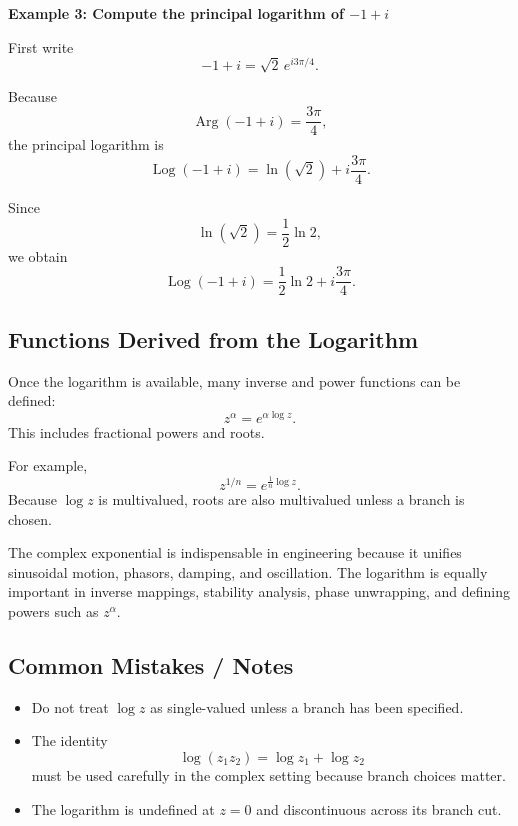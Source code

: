 \begin{examplebox}
    \textbf{Example 3: Compute the principal logarithm of $-1+i$}

    First write
    \[
        -1+i=\sqrt{2}\,e^{i3\pi/4}.
    \]

    Because
    \[
        \operatorname{Arg}(-1+i)=\frac{3\pi}{4},
    \]
    the principal logarithm is
    \[
        \operatorname{Log}(-1+i)=\ln(\sqrt{2})+i\frac{3\pi}{4}.
    \]

    Since
    \[
        \ln(\sqrt{2})=\frac12\ln 2,
    \]
    we obtain
    \[
        \operatorname{Log}(-1+i)=\frac12\ln 2+i\frac{3\pi}{4}.
    \]
\end{examplebox}

\subsection*{Functions Derived from the Logarithm}

Once the logarithm is available, many inverse and power functions can be defined:
\[
    z^\alpha = e^{\alpha \log z}.
\]
This includes fractional powers and roots.

For example,
\[
    z^{1/n}=e^{\frac1n\log z}.
\]
Because $\log z$ is multivalued, roots are also multivalued unless a branch is chosen.

\begin{noteBox}
    The complex exponential is indispensable in engineering because it unifies sinusoidal motion, phasors, damping, and oscillation. The logarithm is equally important in inverse mappings, stability analysis, phase unwrapping, and defining powers such as $z^\alpha$.
\end{noteBox}

\subsection*{Common Mistakes / Notes}

\begin{itemize}
    \item Do not treat $\log z$ as single-valued unless a branch has been specified.
    \item The identity
          \[
              \log(z_1z_2)=\log z_1+\log z_2
          \]
          must be used carefully in the complex setting because branch choices matter.
    \item The logarithm is undefined at $z=0$ and discontinuous across its branch cut.
\end{itemize}